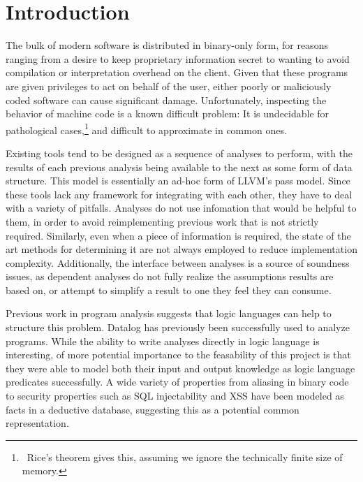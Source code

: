 \chapter{Introduction}
%
%
The bulk of modern software is distributed in binary-only form, for reasons ranging from a desire to keep proprietary information secret to wanting to avoid compilation or interpretation overhead on the client.
Given that these programs are given privileges to act on behalf of the user, either poorly or maliciously coded software can cause significant damage.
Unfortunately, inspecting the behavior of machine code is a known difficult problem:
It is undecidable for pathological cases,\footnote{\
        Rice's theorem gives this, assuming we ignore the technically finite size of memory.
} and difficult to approximate in common ones.
 
Existing tools\cite{ida} tend to be designed as a sequence of analyses to perform, with the results of each previous analysis being available to the next as some form of data structure.
This model is essentially an ad-hoc form of LLVM\cite{llvm}'s pass model.
Since these tools lack any framework for integrating with each other, they have to deal with a variety of pitfalls.
Analyses do not use infomation that would be helpful to them, in order to avoid reimplementing previous work that is not strictly required.
Similarly, even when a piece of information is required, the state of the art methods for determining it are not always employed to reduce implementation complexity.
Additionally, the interface between analyses is a source of soundness issues, as dependent analyses do not fully realize the assumptions results are based on, or attempt to simplify a result to one they feel they can consume.

Previous work in program analysis suggests that logic languages can help to structure this problem.
Datalog has previously been successfully used to analyze programs\cite{Lam2005a, Brumley2006b, Alpuente2011, Smaragdakis, Whaley2007}. 
While the ability to write analyses directly in logic language is interesting, of more potential importance to the feasability of this project is that they were able to model both their input and output knowledge as logic language predicates successfully.
A wide variety of properties from aliasing in binary code\cite{Brumley2006b} to security properties such as SQL injectability and XSS\cite{Lam2005a} have been modeled as facts in a deductive database, suggesting this as a potential common representation. 

